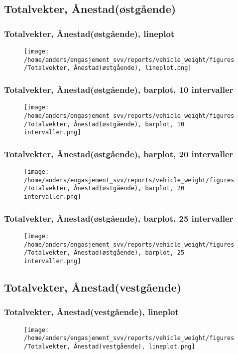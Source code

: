 \documentclass{article}
\begin{document}
\subsection{Totalvekter, Ånestad(østgående)}
\subsubsection{Totalvekter, Ånestad(østgående), lineplot}
\begin{figure}[H]
\centering
\texttt{[image: /home/anders/engasjement\_svv/reports/vehicle\_weight/figures/Totalvekter, Ånestad(østgående), lineplot.png]}
\end{figure}
\subsubsection{Totalvekter, Ånestad(østgående), barplot, 10 intervaller}
\begin{figure}[H]
\centering
\texttt{[image: /home/anders/engasjement\_svv/reports/vehicle\_weight/figures/Totalvekter, Ånestad(østgående), barplot, 10 intervaller.png]}
\end{figure}
\subsubsection{Totalvekter, Ånestad(østgående), barplot, 20 intervaller}
\begin{figure}[H]
\centering
\texttt{[image: /home/anders/engasjement\_svv/reports/vehicle\_weight/figures/Totalvekter, Ånestad(østgående), barplot, 20 intervaller.png]}
\end{figure}
\subsubsection{Totalvekter, Ånestad(østgående), barplot, 25 intervaller}
\begin{figure}[H]
\centering
\texttt{[image: /home/anders/engasjement\_svv/reports/vehicle\_weight/figures/Totalvekter, Ånestad(østgående), barplot, 25 intervaller.png]}
\end{figure}
\subsection{Totalvekter, Ånestad(vestgående)}
\subsubsection{Totalvekter, Ånestad(vestgående), lineplot}
\begin{figure}[H]
\centering
\texttt{[image: /home/anders/engasjement\_svv/reports/vehicle\_weight/figures/Totalvekter, Ånestad(vestgående), lineplot.png]}
\end{figure}
\end{document}
